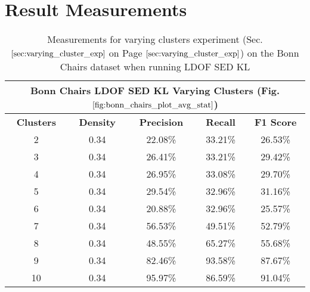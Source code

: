 \chapter{Result Measurements}
\label{chap:result_measurements}

\begin{table}[H]
\centering
\begin{tabular}{|c|c|c|c|c|}
\hline
\multicolumn{5}{|c|}{Bonn Chairs LDOF SED KL Varying Clusters (Fig. $\ref{fig:bonn_chairs_plot_avg_stat}$)}                        \\ \hline
\textbf{Clusters} & \textbf{Density} & \textbf{Precision} & \textbf{Recall} & \textbf{F1 Score} \\ \hline
2 & 0.34 & 22.08\%   & 33.21\%     & 26.53\%  \\ \hline
3 & 0.34 & 26.41\%   & 33.21\%     & 29.42\%  \\ \hline
4 & 0.34 & 26.95\%   & 33.08\%     & 29.70\%  \\ \hline
5 & 0.34 & 29.54\%   & 32.96\%     & 31.16\%  \\ \hline
6 & 0.34 & 20.88\%   & 32.96\%     & 25.57\%  \\ \hline
7 & 0.34 & 56.53\%   & 49.51\%     & 52.79\%  \\ \hline
8 & 0.34 & 48.55\%   & 65.27\%     & 55.68\%  \\ \hline
9 & 0.34 & 82.46\%   & 93.58\%     & 87.67\%  \\ \hline              
10 & 0.34 & 95.97\%   & 86.59\%     & 91.04\%  \\ \hline
\end{tabular}
\caption[Bonn Chairs SED Varying Clusters]{Measurements for varying clusters experiment (Sec. $\ref{sec:varying_cluster_exp}$ on Page $\pageref{sec:varying_cluster_exp}$) on the Bonn Chairs dataset when running LDOF SED KL}

\label{tab:bonn_chairs_ldof_sed_c_6_9_10_eval}
\end{table}

